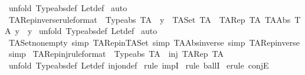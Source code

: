 \begin{isabellebody}
%
\isadelimproof
%
\endisadelimproof
%
\isatagproof
{}\isamarkupfalse%
\ {\isacharparenleft}unfold\ Typeabs{\isacharunderscore}def\ Let{\isacharunderscore}def{\isacharparenright}\isanewline
{}\isamarkupfalse%
\ auto\isanewline
{}\isamarkupfalse%
%
\endisatagproof
{\isafoldproof}%
%
\isadelimproof
\isanewline
%
\endisadelimproof
\isanewline
{}\isamarkupfalse%
\ TARep{\isacharunderscore}inverse{\isacharbrackleft}rule{\isacharunderscore}format{\isacharbrackright}\ {\isacharcolon}\ {\isachardoublequoteopen}Typeabs\ TA\ {\isacharminus}{\isacharminus}{\isachargreater}\ y\ {\isacharcolon}\ {\isacharparenleft}TASet\ TA{\isacharparenright}\ {\isacharminus}{\isacharminus}{\isachargreater}\ {\isacharparenleft}TARep\ TA\ {\isacharparenleft}TAAbs\ TA\ y{\isacharparenright}{\isacharparenright}\ {\isacharequal}\ y{\isachardoublequoteclose}\isanewline
%
\isadelimproof
%
\endisadelimproof
%
\isatagproof
{}\isamarkupfalse%
\ {\isacharparenleft}unfold\ Typeabs{\isacharunderscore}def\ Let{\isacharunderscore}def{\isacharparenright}\isanewline
{}\isamarkupfalse%
\ auto\isanewline
{}\isamarkupfalse%
%
\endisatagproof
{\isafoldproof}%
%
\isadelimproof
\isanewline
%
\endisadelimproof
\isanewline
{}\isamarkupfalse%
\ TASet{\isacharunderscore}nonempty\ {\isacharbrackleft}simp{\isacharbrackright}\ TARep{\isacharunderscore}in{\isacharunderscore}TASet\ {\isacharbrackleft}simp{\isacharbrackright}\ TAAbs{\isacharunderscore}inverse\ {\isacharbrackleft}simp{\isacharbrackright}\ TARep{\isacharunderscore}inverse\ {\isacharbrackleft}simp{\isacharbrackright}\isanewline
\isanewline
{}\isamarkupfalse%
\ TARep{\isacharunderscore}inj{\isacharbrackleft}rule{\isacharunderscore}format{\isacharbrackright}\ {\isacharcolon}\ {\isachardoublequoteopen}Typeabs\ TA\ {\isacharminus}{\isacharminus}{\isachargreater}\ {\isacharparenleft}inj\ {\isacharparenleft}TARep\ TA{\isacharparenright}{\isacharparenright}{\isachardoublequoteclose}\isanewline
%
\isadelimproof
%
\endisadelimproof
%
\isatagproof
{}\isamarkupfalse%
\ {\isacharparenleft}unfold\ Typeabs{\isacharunderscore}def\ Let{\isacharunderscore}def\ inj{\isacharunderscore}on{\isacharunderscore}def{\isacharparenright}\isanewline
{}\isamarkupfalse%
\ {\isacharparenleft}rule\ impI{\isacharparenright}\isanewline
{}\isamarkupfalse%
\ {\isacharparenleft}rule\ ballI{\isacharparenright}{\isacharplus}\isanewline
{}\isamarkupfalse%
\ {\isacharparenleft}erule\ conjE{\isacharparenright}{\isacharplus}\isanewline

\end{isabellebody}
